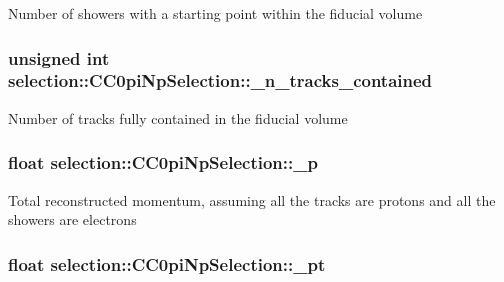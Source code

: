 Number of showers with a starting point within the fiducial volume \hypertarget{classselection_1_1CC0piNpSelection_a22c5cd4cf8882fa3cbabf25ed86d1f39}{
\subsubsection[{\-\_\-n\-\_\-tracks\-\_\-contained}]{\setlength{\rightskip}{0pt plus 5cm}unsigned int selection\-::\-C\-C0pi\-Np\-Selection\-::\-\_\-n\-\_\-tracks\-\_\-contained\hspace{0.3cm}{\ttfamily [private]}}}\label{classselection_1_1CC0piNpSelection_a22c5cd4cf8882fa3cbabf25ed86d1f39}
Number of tracks fully contained in the fiducial volume \hypertarget{classselection_1_1CC0piNpSelection_afae64b232d6b3526032b289c91b092cb}{
\subsubsection[{\-\_\-p}]{\setlength{\rightskip}{0pt plus 5cm}float selection\-::\-C\-C0pi\-Np\-Selection\-::\-\_\-p\hspace{0.3cm}{\ttfamily [private]}}}\label{classselection_1_1CC0piNpSelection_afae64b232d6b3526032b289c91b092cb}
Total reconstructed momentum, assuming all the tracks are protons and all the showers are electrons \hypertarget{classselection_1_1CC0piNpSelection_a98281b58b33ff8c03fa9b00f3f3baa06}{
\subsubsection[{\-\_\-pt}]{\setlength{\rightskip}{0pt plus 5cm}float selection\-::\-C\-C0pi\-Np\-Selection\-::\-\_\-pt\hspace{0.3cm}{\ttfamily [private]}}}\label{classselection_1_1CC0piNpSelection_a98281b58b33ff8c03fa9b00f3f3baa06}
